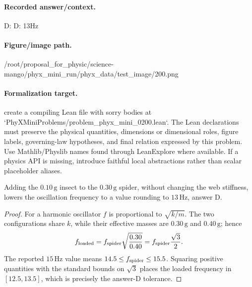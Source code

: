 \paragraph{Recorded answer/context.}
D: D: 13Hz

\paragraph{Figure/image path.}
/root/proposal\_for\_physic/science-mango/phyx\_mini\_run/phyx\_data/test\_image/200.png

\paragraph{Formalization target.}
create a compiling Lean file with sorry bodies at `PhyXMiniProblems/problem\_phyx\_mini\_0200.lean`. The Lean declarations must preserve the physical quantities, dimensions or dimensional roles, figure labels, governing-law hypotheses, and final relation expressed by this problem.
Use Mathlib/Physlib names found through LeanExplore where available. If a physics API is missing, introduce faithful local abstractions rather than scalar placeholder aliases.

\begin{theorem}
\label{thm:physics:phyx_mini_0200:target}
Adding the \(0.10\,\mathrm g\) insect to the \(0.30\,\mathrm g\) spider,
without changing the web stiffness, lowers the oscillation frequency to a
value rounding to \(13\,\mathrm{Hz}\), answer D.
\end{theorem}
\begin{proof}
For a harmonic oscillator \(f\) is proportional to
\(\sqrt{k/m}\).  The two configurations share \(k\), while their effective
masses are \(0.30\,\mathrm g\) and \(0.40\,\mathrm g\); hence
\[
 f_{\rm loaded}=f_{\rm spider}\sqrt{\frac{0.30}{0.40}}
                =f_{\rm spider}\frac{\sqrt3}{2}.
\]
The reported \(15\,\mathrm{Hz}\) value means
\(14.5\le f_{\rm spider}\le15.5\).  Squaring positive quantities with the
standard bounds on \(\sqrt3\) places the loaded frequency in
\([12.5,13.5]\), which is precisely the answer-D tolerance.
\end{proof}


